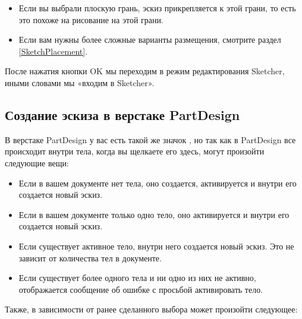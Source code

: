\documentclass[12pt,titlepage]{article}
\newcommand{\icon}[1]{\raisebox{-1em}{\rule{0pt}{27pt}\texttt{[image: images/\#1]}}}
\newcommand{\img}[2]{\vspace{2ex}\noindent\texttt{[image: images/\#2]}}
\begin{document}
\begin{itemize}
 ничего не было выбрано, вас спросят об ориентации эскиза:

\img{scale=0.8}{Orientation}

С помощью радиокнопки вы можете управлять плоскостью, в которой вы хотите создать эскиз. Отметка «Развернуть направление» прикрепит эскиз к обратной стороне выбранной плоскости, по аналогии с  рисунком на обратной стороне листа бумаги. «Смещение» перемещает эскиз в направлении, перпендикулярном выбранной плоскости.

\item Если вы выбрали плоскую грань, эскиз прикрепляется к этой грани, то есть это похоже на рисование на этой грани.

\item Если вам нужны более сложные варианты размещения, смотрите раздел       \ref{SketchPlacement}.
\end{itemize}
После нажатия кнопки OK мы переходим в режим редактирования Sketcher, иными словами мы «входим в Sketcher».


\subsection{Создание эскиза в верстаке PartDesign}
В верстаке PartDesign у вас есть такой же значок \icon{Sketcher_NewSketch}, но так как в PartDesign все происходит внутри тела, когда вы щелкаете его здесь, могут произойти следующие вещи:

\begin{itemize}
\item Если в вашем документе нет тела, оно создается, активируется и внутри его создается новый эскиз.
\item Если в вашем документе только одно тело, оно активируется и внутри его создается новый эскиз.
\item Если существует активное тело, внутри него  создается новый эскиз. Это не зависит от количества тел в документе.
\item Если существует более одного тела и ни одно из них не активно, отображается сообщение об ошибке с просьбой активировать тело.
\end{itemize}
Также, в зависимости от ранее сделанного выбора может произойти следующее:
\end{document}
